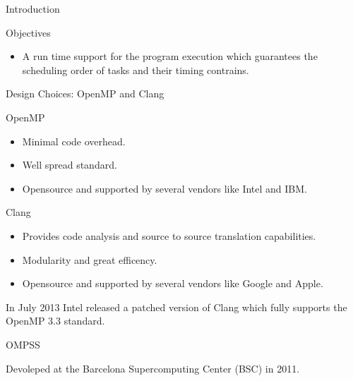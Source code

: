 \documentclass[xcolor=dvipsnames]{beamer}
\begin{document}
\begin{section}{Introduction}
\begin{frame}{\hskip 0.3cm Objectives }
\begin{itemize}
\item A run time support for the program execution which guarantees the scheduling order of tasks and their timing contrains.

\end{itemize}



\end{frame}











\begin{frame}{\hskip 0.3cm Design Choices: OpenMP and Clang}


OpenMP 

\begin{itemize}

\item Minimal code overhead.

\item  Well spread standard.

\item Opensource and supported by several vendors like Intel and IBM.

\end{itemize}

Clang

\begin{itemize}

\item Provides code analysis and source to source translation capabilities.

\item Modularity and great efficency.

\item Opensource and supported by several vendors like Google and Apple.

\end{itemize}
In July 2013 Intel released a patched version of Clang which fully supports the OpenMP 3.3 standard. 

\end{frame}










\begin{frame}{\hskip 0.3cm OMPSS}

Devoleped at the Barcelona Supercomputing Center (BSC) in 2011.


\end{frame}
\end{section}
\end{document}
